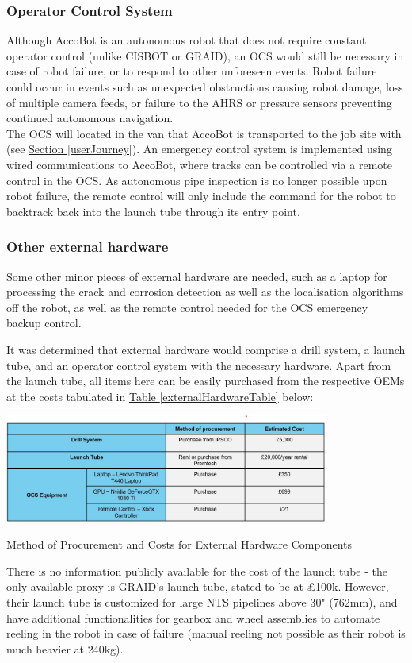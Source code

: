 \documentclass[11pt]{article}		%
\newcommand{\tableref}[1]{\hyperref[#1]{Table \ref*{#1}}}     %
\newcommand{\sectref}[1]{\hyperref[#1]{Section \ref*{#1}}}     %
\begin{document}
		\subsubsection{Operator Control System}
    Although AccoBot is an autonomous robot that does not require constant operator control (unlike CISBOT or GRAID), an OCS would still be necessary in case of robot failure, or to respond to other unforeseen events.  Robot failure could occur in events such as unexpected obstructions causing robot damage, loss of multiple camera feeds, or failure to the AHRS or pressure sensors preventing continued autonomous navigation.
    \\ \hspace*{3ex} The OCS will located in the van that AccoBot is transported to the job site with (see \sectref{userJourney}). An emergency control system is implemented using wired communications to AccoBot, where tracks can be controlled via a remote control in the OCS. As autonomous pipe inspection is no longer possible upon robot failure, the remote control will only include the command for the robot to backtrack back into the launch tube through its entry point.  
    \subsubsection{Other external hardware}
    Some other minor pieces of external hardware are needed, such as a laptop for processing the crack and corrosion detection as well as the localisation algorithms off the robot, as well as the remote control needed for the OCS emergency backup control. 
    
    It was determined that external hardware would comprise a drill system, a launch tube, and an operator control system with the necessary hardware. Apart from the launch tube, all items here can be easily purchased from the respective OEMs at the costs tabulated in \tableref{externalHardwareTable} below:
    		
    			\begin{table}[H]
    	  		
    	  		\centering
    	  		\includegraphics[width=0.8\textwidth]{External Hardware costs.jpg}
    				\caption{Method of Procurement and Costs for External Hardware Components}
    				\label{externalHardwareTable}
    			\end{table}
    		There is no information publicly available for the cost of the launch tube - the only available proxy is GRAID's launch tube, stated to be at £100k. However, their launch tube is customized for large NTS pipelines above 30" (762mm), and have additional functionalities for gearbox and wheel assemblies to automate reeling in the robot in case of failure (manual reeling not possible as their robot is much heavier at 240kg). 
    		
\end{document}
